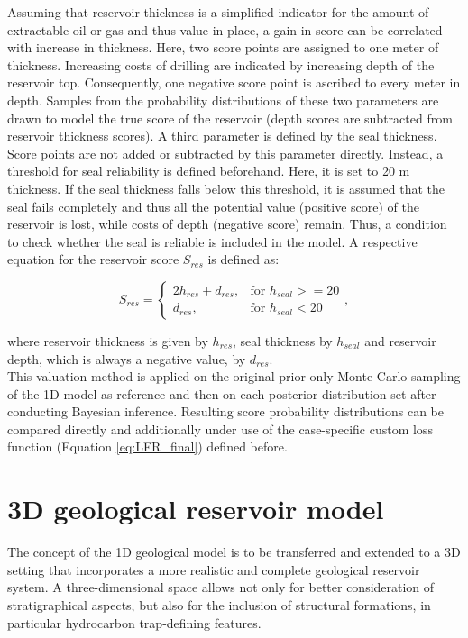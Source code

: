 	        Assuming that reservoir thickness is a simplified indicator for the amount of extractable oil or gas and thus value in place, a gain in score can be correlated with increase in thickness. Here, two score points are assigned to one meter of thickness. Increasing costs of drilling are indicated by increasing depth of the reservoir top. Consequently, one negative score point is ascribed to every meter in depth. Samples from the probability distributions of these two parameters are drawn to model the true score of the reservoir (depth scores are subtracted from reservoir thickness scores).
	        A third parameter is defined by the seal thickness. Score points are not added or subtracted by this parameter directly. Instead, a threshold for seal reliability is defined beforehand. Here, it is set to 20 m thickness. If the seal thickness falls below this threshold, it is assumed that the seal fails completely and thus all the potential value (positive score) of the reservoir is lost, while costs of depth (negative score) remain. Thus, a condition to check whether the seal is reliable is included in the model. A respective equation for the reservoir score $S_{res}$ is defined as:
			
			\begin{equation}\label{eq:1D_score_system}
			S_{res} = 
			\begin{cases}
			2h_{res} + d_{res}, & \text{for } h_{seal} >= 20  \\
			d_{res}, & \text{for } h_{seal} < 20
			\end{cases},
			\end{equation}
			
			where reservoir thickness is given by $h_{res}$, seal thickness by $h_{seal}$ and reservoir depth, which is always a negative value, by $d_{res}$.\\
			This valuation method is applied on the original prior-only Monte Carlo sampling of the 1D model as reference and then on each posterior distribution set after conducting Bayesian inference. Resulting score probability distributions can be compared directly and additionally under use of the case-specific custom loss function (Equation \ref{eq:LFR_final}) defined before. 
		
		\section{3D geological reservoir model}\label{sec:3D_model}
		The concept of the 1D geological model is to be transferred and extended to a 3D setting that incorporates a more realistic and complete geological reservoir system. A three-dimensional space allows not only for better consideration of stratigraphical aspects, but also for the inclusion of structural formations, in particular hydrocarbon trap-defining features.
		
